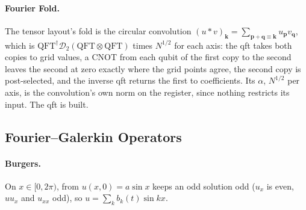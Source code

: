 \paragraph{Fourier Fold.} The tensor layout's fold is the circular convolution $(u*v)_{\mathbf k}=\sum_{\mathbf p+\mathbf q\equiv\mathbf k}u_{\mathbf p}v_{\mathbf q}$, which is $\mathrm{QFT}^\dagger\mathcal{D}_2(\mathrm{QFT}\otimes\mathrm{QFT})$ times $N^{1/2}$ for each axis: the \gls{qft} takes both copies to grid values, a CNOT from each qubit of the first copy to the second leaves the second at zero exactly where the grid points agree, the second copy is post-selected, and the inverse \gls{qft} returns the first to coefficients. Its $\alpha$, $N^{1/2}$ per axis, is the convolution's own norm on the register, since nothing restricts its input. The \gls{qft} is built.

\subsection{Fourier--Galerkin Operators}
\label{app:fluids}

\paragraph{Burgers.} On $x\in[0,2\pi)$,  from $u(x,0)=a\sin x$ keeps an odd solution odd ($u_x$ is even, $uu_x$ and $u_{xx}$ odd), so $u=\sum_kb_k(t)\sin kx$.

